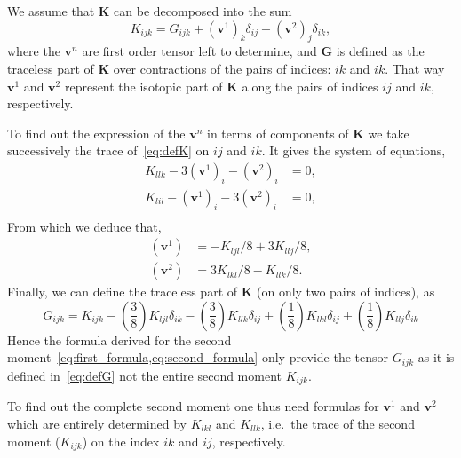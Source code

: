 We assume that $\textbf{K}$ can be decomposed into the sum
\begin{equation}
    K_{ijk} = G_{ijk}  + (\textbf{v}^1)_k \delta_{ij} + (\textbf{v}^2)_j \delta_{ik}, 
   \label{eq:defK}
\end{equation}
where the $\textbf{v}^n$ are first order tensor left to determine, and \textbf{G} is defined as the traceless part of \textbf{K} over contractions of the pairs of indices: $ik$ and $ik$. 
That way $\textbf{v}^1$ and $\textbf{v}^2$ represent the isotopic part of \textbf{K} along the pairs of indices $ij$ and $ik$, respectively. 

To find out the expression of the $\textbf{v}^n$ in terms of components of $\textbf{K}$ we take successively the trace of~\ref{eq:defK} on $ij$ and $ik$. 
It gives the system of equations, 
\begin{align}
    K_{llk} - 3(\textbf{v}^1)_i - (\textbf{v}^2)_i &= 0,\\
    K_{lil} - (\textbf{v}^1)_i - 3(\textbf{v}^2)_i &= 0,\\
\end{align}
From which we deduce that, 
\begin{align}
    (\textbf{v}^1) &=  -K_{ljl}/8 + 3K_{llj}/8, \\
    (\textbf{v}^2) &=  3K_{lkl}/8 - K_{llk}/8.
\end{align}
Finally, we can define the traceless part of \textbf{K} (on only two pairs of indices), as
\begin{equation}
    G_{ijk} = 
    K_{ijk}
    -\left(\frac{3}{8}\right)K_{ljl}\delta_{ik} - \left(\frac{3}{8}\right)K_{llk}\delta_{ij}  + \left(\frac{1}{8}\right)K_{lkl}\delta_{ij} + \left(\frac{1}{8}\right)K_{llj}\delta_{ik}
    \label{eq:defG}
\end{equation}
Hence the formula derived for the second moment~\ref{eq:first_formula,eq:second_formula} only provide the tensor $G_{ijk}$ as it is defined in~\ref{eq:defG} not the entire second moment $K_{ijk}$. 

To find out the complete second moment one thus need formulas for $\textbf{v}^1$ and $\textbf{v}^2$ which are entirely determined by $K_{lkl}$ and $K_{llk}$, i.e.~the trace of the second moment ($K_{ijk}$) on the index $ik$ and $ij$, respectively. 


